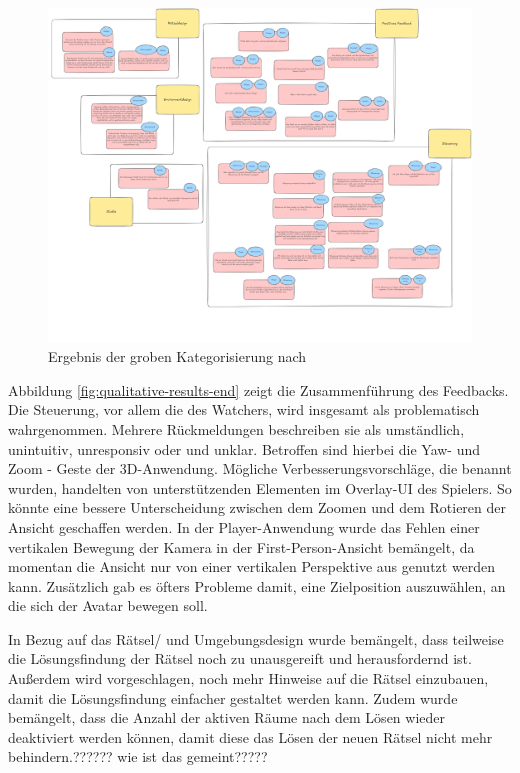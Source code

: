 \begin{figure}[ht]
\centering
\includegraphics[width=1\linewidth]{content/pictures/Qualitative-Auswertung-Schritt-1.png}
\caption{Ergebnis der groben Kategorisierung nach \cite{braun_using_2006}}
\label{fig:qualitative-results}
\end{figure}

Abbildung \ref{fig:qualitative-results-end} zeigt die Zusammenführung des Feedbacks. 
Die Steuerung, vor allem die des Watchers, wird insgesamt als problematisch wahrgenommen. Mehrere Rückmeldungen beschreiben sie als umständlich, unintuitiv, unresponsiv oder  und unklar. Betroffen sind hierbei die Yaw- und Zoom - Geste der \ac{3D}-Anwendung. Mögliche Verbesserungsvorschläge, die benannt wurden, handelten von unterstützenden Elementen im Overlay-\ac{UI} des Spielers. So könnte eine bessere Unterscheidung zwischen dem Zoomen und dem Rotieren der Ansicht geschaffen werden. 
In der Player-Anwendung wurde das Fehlen einer vertikalen Bewegung der Kamera in der First-Person-Ansicht bemängelt, da momentan die Ansicht nur von einer vertikalen Perspektive aus genutzt werden kann. Zusätzlich gab es öfters Probleme damit, eine Zielposition auszuwählen, an die sich der Avatar bewegen soll.

In Bezug auf das Rätsel/ und Umgebungsdesign wurde bemängelt, dass teilweise die Lösungsfindung der Rätsel noch zu unausgereift und herausfordernd ist. 
Außerdem wird vorgeschlagen, noch mehr Hinweise auf die Rätsel einzubauen, damit die Lösungsfindung einfacher gestaltet werden kann. Zudem wurde bemängelt, dass die Anzahl der aktiven Räume nach dem Lösen wieder deaktiviert werden können, damit diese das Lösen der neuen Rätsel nicht mehr behindern.?????? wie ist das gemeint?????


